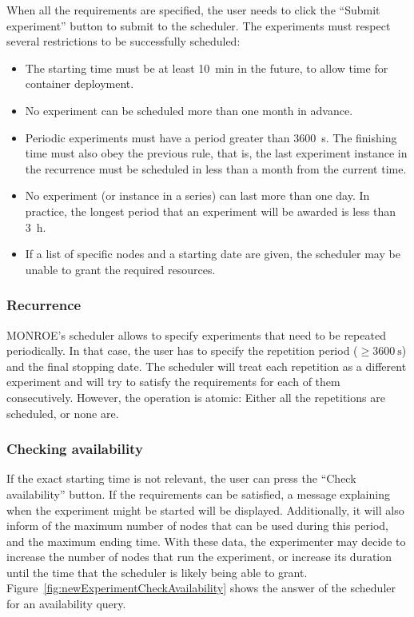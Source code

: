 \documentclass[a4paper,10pt]{article}
\newcommand{\monroe}{MONROE}
\begin{document}
When all the requirements are specified, the user needs to click the ``Submit experiment'' button to submit to the scheduler.
The experiments must respect several restrictions to be successfully scheduled:
\begin{itemize}
	\item The starting time must be at least \SI{10}{\minute} in the future, to allow time for container deployment.
	\item No experiment can be scheduled more than one month in advance.
	\item Periodic experiments must have a period greater than \SI{3600}{\second}.
	The finishing time must also obey the previous rule, that is, the last experiment instance in the recurrence must be scheduled in less than a month from the current time.
	\item No experiment (or instance in a series) can last more than one day.
	In practice, the longest period that an experiment will be awarded is less than \SI{3}{\hour}.
	\item If a list of specific nodes and a starting date are given, the scheduler may be unable to grant the required resources.
\end{itemize}

\subsubsection{Recurrence}
\monroe{}'s scheduler allows to specify experiments that need to be repeated periodically.
In that case, the user has to specify the repetition period ($\ge \SI{3600}{\second}$) and the final stopping date.
The scheduler will treat each repetition as a different experiment and will try to satisfy the requirements for each of them consecutively.
However, the operation is atomic:
Either all the repetitions are scheduled, or none are.

\subsubsection{Checking availability}
If the exact starting time is not relevant, the user can press the ``Check availability'' button.
If the requirements can be satisfied, a message explaining when the experiment might be started will be displayed.
Additionally, it will also inform of the maximum number of nodes that can be used during this period, and the maximum ending time.
With these data, the experimenter may decide to increase the number of nodes that run the experiment, or increase its duration until the time that the scheduler is likely being able to grant.
Figure~\ref{fig:newExperimentCheckAvailability} shows the answer of the scheduler for an availability query.
\end{document}
